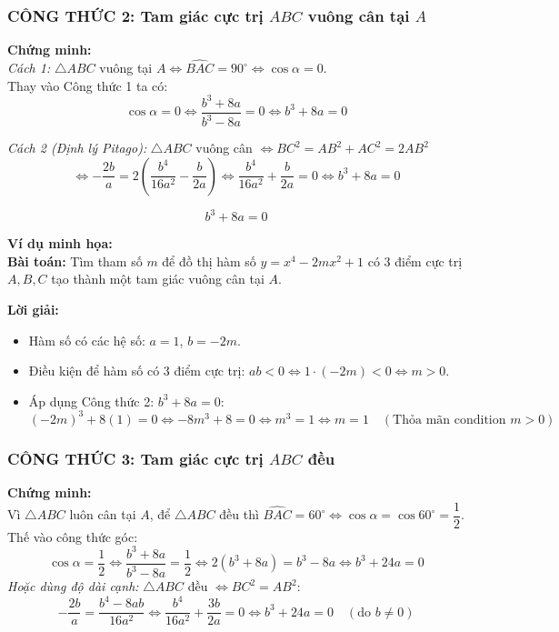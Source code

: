 \begin{itemize}
\vspace{0.5cm}

\subsubsection{CÔNG THỨC 2: Tam giác cực trị $ABC$ vuông cân tại $A$}

\noindent \textbf{Chứng minh:} \\
\textit{Cách 1:} $\triangle ABC$ vuông tại $A \iff \widehat{BAC} = 90^\circ \iff \cos \alpha = 0$. \\
Thay vào Công thức 1 ta có:
\[
\cos \alpha = 0 \iff \frac{b^3 + 8a}{b^3 - 8a} = 0 \iff b^3 + 8a = 0
\]

\noindent \textit{Cách 2 (Định lý Pitago):} $\triangle ABC$ vuông cân $\iff BC^2 = AB^2 + AC^2 = 2AB^2$
\[
\iff -\frac{2b}{a} = 2\left(\frac{b^4}{16a^2} - \frac{b}{2a}\right) \iff \frac{b^4}{16a^2} + \frac{b}{2a} = 0 \iff b^3 + 8a = 0
\]

\begin{tcolorbox}[title=CÔNG THỨC GIẢI NHANH 2]
\[
b^3 + 8a = 0
\]
\end{tcolorbox}

\noindent \textbf{Ví dụ minh họa:} \\
\textbf{Bài toán:} Tìm tham số $m$ để đồ thị hàm số $y = x^4 - 2mx^2 + 1$ có 3 điểm cực trị $A, B, C$ tạo thành một tam giác vuông cân tại $A$.

\noindent \textbf{Lời giải:}
\begin{itemize}
    \item Hàm số có các hệ số: $a = 1$, $b = -2m$.
    \item Điều kiện để hàm số có 3 điểm cực trị: $ab < 0 \iff 1 \cdot (-2m) < 0 \iff m > 0$.
    \item Áp dụng Công thức 2: $b^3 + 8a = 0$:
    \[
    (-2m)^3 + 8(1) = 0 \iff -8m^3 + 8 = 0 \iff m^3 = 1 \iff m = 1 \quad (\text{Thỏa mãn condition } m > 0)
    \]
\end{itemize}
\subsubsection{CÔNG THỨC 3: Tam giác cực trị $ABC$ đều}

\noindent \textbf{Chứng minh:} \\
Vì $\triangle ABC$ luôn cân tại $A$, để $\triangle ABC$ đều thì $\widehat{BAC} = 60^\circ \iff \cos \alpha = \cos 60^\circ = \dfrac{1}{2}$. \\
Thế vào công thức góc:
\[
\cos \alpha = \frac{1}{2} \iff \frac{b^3 + 8a}{b^3 - 8a} = \frac{1}{2} \iff 2(b^3 + 8a) = b^3 - 8a \iff b^3 + 24a = 0
\]
\textit{Hoặc dùng độ dài cạnh:} $\triangle ABC$ đều $\iff BC^2 = AB^2$:
\[
-\frac{2b}{a} = \frac{b^4 - 8ab}{16a^2} \iff \frac{b^4}{16a^2} + \frac{3b}{2a} = 0 \iff b^3 + 24a = 0 \quad (\text{do } b \neq 0)
\]


\end{itemize}
